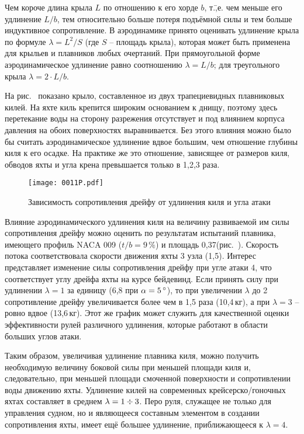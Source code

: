Чем короче длина крыла $L$ по отношению к его хорде $b$, т.\=,е. чем
меньше его удлинение $L/b$, тем относительно больше потеря подъёмной
силы и тем больше индуктивное сопротивление. В аэродинамике принято
оценивать удлинение крыла по формуле $\lambda = L^2/S$ (где $S$ \---
площадь крыла), которая может быть применена для крыльев и плавников
любых очертаний. При прямоугольной форме аэродинамическое удлинение
равно соотношению $\lambda = L / b$; для треугольного крыла
$\lambda = 2 \cdot L / b$.

На рис.~ показано крыло, составленное из двух трапециевидных
плавниковых килей. На яхте киль крепится широким основанием к днищу,
поэтому здесь перетекание воды на сторону разрежения отсутствует и под
влиянием корпуса давления на обоих поверхностях выравнивается. Без
этого влияния можно было бы считать аэродинамическое удлинение вдвое
большим, чем отношение глубины киля к его осадке. На практике же это
отношение, зависящее от размеров киля, обводов яхты и угла крена
превышается только в 1,2,3 раза.

\begin{figure}
  \centering
  \texttt{[image: 0011P.pdf]}
  \caption{Зависимость сопротивления дрейфу от удлинения киля и угла атаки}
  \label{fig:11}
\end{figure}

Влияние аэродинамического удлинения киля на величину развиваемой им
силы сопротивления дрейфу  можно оценить по результатам
испытаний плавника, имеющего профиль NACA 009 ($t/b = 9\,\%$) и
площадь 0,37\msq (рис.~). Скорость потока соответствовала
скорости движения яхты 3 узла (1,5\speedms). Интерес представляет
изменение силы сопротивления дрейфу при угле атаки 4\gr, что
соответствует углу дрейфа яхты на курсе бейдевинд. Если принять силу
 при удлинении $\lambda = 1$ за единицу (6,8 при
$\alpha = 5\,^\circ$), то при увеличении $\lambda$ до 2 сопротивление
дрейфу увеличивается более чем в 1,5 раза (10,4\,кг), а при
$\lambda = 3$ \--- ровно вдвое (13,6\,кг). Этот же график может
служить для качественной оценки эффективности рулей различного
удлинения, которые работают в области больших углов атаки.

Таким образом, увеличивая удлинение плавника киля, можно получить
необходимую величину боковой силы  при меньшей площади киля
и, следовательно, при меньшей площади смоченной поверхности и
сопротивлении воды движению яхты. Удлинение килей на современных
крейсерско\-/гоночных яхтах составляет в среднем
$\lambda = 1 \div 3$. Перо руля, служащее не только для управления
судном, но и являющееся составным элементом в создании сопротивления
яхты, имеет ещё большее удлинение, приближающееся к $\lambda = 4$.

